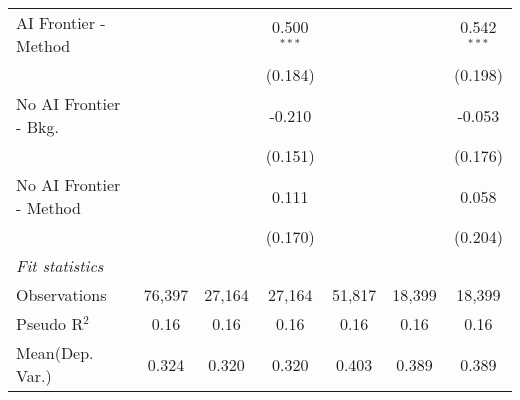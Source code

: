 \begin{tabular}{lcccccc}
   AI Frontier - Method    &               &               & 0.500$^{***}$ &               &               & 0.542$^{***}$\\   
                           &               &               & (0.184)       &               &               & (0.198)\\   
   No AI Frontier - Bkg.   &               &               & -0.210        &               &               & -0.053\\   
                           &               &               & (0.151)       &               &               & (0.176)\\   
   No AI Frontier - Method &               &               & 0.111         &               &               & 0.058\\   
                           &               &               & (0.170)       &               &               & (0.204)\\   
   \midrule
   \emph{Fit statistics}\\
   Observations            & 76,397        & 27,164        & 27,164        & 51,817        & 18,399        & 18,399\\  
   Pseudo R$^2$            & 0.16          & 0.16          & 0.16          & 0.16          & 0.16          & 0.16\\  
Mean(Dep. Var.) & 0.324 & 0.320 & 0.320 & 0.403 & 0.389 & 0.389 \\
   

\end{tabular}
